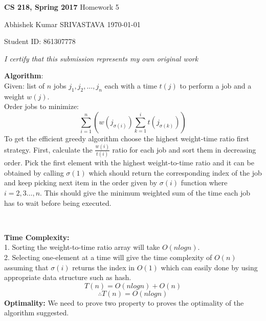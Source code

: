 \documentclass[a4paper,11pt]{article}
\renewcommand{\maketitle}{%
	
	\Large
 	\textbf{CS 218, Spring 2017}
 	\hfill
 	Homework 5
 	\par
 	
	\Large
	Abhishek Kumar SRIVASTAVA
	\hfill
	\normalsize
	\today
 	\par
 	Student ID: 861307778
 	\par
 	
 	\begin{center}

 	\vspace{.2in}
 	
 	\textit{I certify that this submission represents my own original work }
 	\par
	\vspace{.2in}
	\makebox[2.4in]{\hrulefill}
	\par

 	\end{center}
 	
 	\hrulefill
 	\par \vspace{2ex}
 	}
\theoremstyle{quest}
\newenvironment{solution}[2][Solution]{\begin{trivlist}
		\item[\hskip \labelsep {\bfseries #1}\hskip \labelsep {\bfseries #2.}]}{\end{trivlist}}
\begin{document}
\thispagestyle{empty}
	
\maketitle

\begin{solution}1
	\textbf{Algorithm}:\\
	
	Given: list of $n$ jobs $j_1, j_2, \dots, j_n$ each with a
	time $t(j)$ to perform a job and a weight $w(j)$.\\
	
	Order jobs to minimize: \[
	\sum_{i=1}^{n} \left( w(j_{\sigma(i)})  \sum_{k=1}^{i} t(j_{\sigma(k)}) \right)
	\]
	To get the efficient greedy algorithm choose the highest weight-time ratio first strategy. First, calculate the $\frac{w(i)}{t(i)}$ ratio for each job and sort them in decreasing order. Pick the first element with the highest weight-to-time ratio and it can be obtained by calling $\sigma(1)$ which should return the corresponding index of the job and keep picking next item in the order given by $\sigma(i)$ function where $i = 2,3 \dots ,n$. This should give the minimum weighted sum of the time each job has to wait before being executed.
	
		\begin{algorithm}
			\begin{algorithmic}
				 
				 
				\EndFor
				 
				 
				 \\ 
				\EndFor
				\EndFunction	
			\end{algorithmic} 	
		\end{algorithm}
	  \textbf{Time Complexity:}\\
	  
	  1. Sorting the weight-to-time ratio array will take $O(nlog n)$.\\
	  
	  2. Selecting one-element at a time will give the time complexity of $O(n)$ assuming that $\sigma(i)$ returns the index in $O(1)$ which can easily done by using appropriate data structure such as hash.\\
	  \begin{equation*}
	  T(n) = O(n log n) + O(n)
	  \end{equation*}
	  \begin{equation*}
	  \therefore T(n) = O(n log n)
	  \end{equation*}
	  \newpage
	  \textbf{Optimality:} We need to prove two property to proves the optimality of the algorithm suggested.\\
	  

\end{solution}
\end{document}
